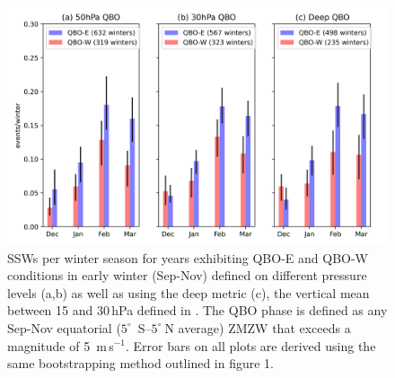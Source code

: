 \documentclass[wcd, manuscript]{copernicus}
\begin{document}
\begin{center}
\begin{figure}[h!]
\noindent\includegraphics[width = 0.7\linewidth]{figures/SSW_histograms_QBOphases.png}
\caption{SSWs per winter season for years exhibiting QBO-E and QBO-W conditions in early winter (Sep-Nov) defined on different pressure levels (a,b) as well as using the deep metric (c), the vertical mean between 15 and 30\,hPa defined in \cite{Andrews2019}. The QBO phase is defined as any Sep-Nov equatorial ($5^{\circ}$\ S--$5^{\circ}\ $N average) ZMZW that exceeds a magnitude of 5\ m\,s$^{-1}$. Error bars on all plots are derived using the same bootstrapping method outlined in figure 1.}
\label{fig1}
\end{figure}
\end{center}
\end{document}

